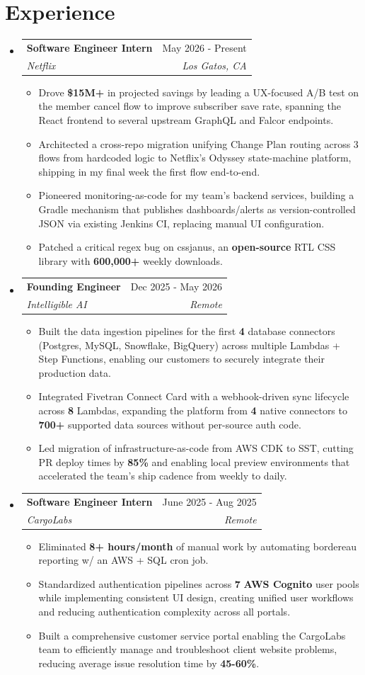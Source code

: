 \documentclass[letterpaper,11pt]{article}
\makeatletter
\newcommand{\resumeItem}[1]{
  \item\small{
    {#1 \vspace{-2pt}}
  }
}
\newcommand{\resumeSubheading}[4]{
  \vspace{-2pt}\item
    \begin{tabular*}{0.97\textwidth}[t]{l@{\extracolsep{\fill}}r}
      \textbf{#1} & #2 \\
      \textit{\small#3} & \textit{\small #4} \\
    \end{tabular*}\vspace{-7pt}
}
\newcommand{\resumeSubHeadingListStart}{\begin{itemize}[leftmargin=0.15in, label={}]}
\newcommand{\resumeSubHeadingListEnd}{\end{itemize}}
\newcommand{\resumeItemListStart}{\begin{itemize}}
\newcommand{\resumeItemListEnd}{\end{itemize}\vspace{-5pt}}
\makeatother
\begin{document}
\section{Experience}
    \resumeSubHeadingListStart

        \resumeSubheading
            {Software Engineer Intern }{May 2026 - Present}
            {Netflix}{Los Gatos, CA}
            \resumeItemListStart
                \resumeItem{Drove \textbf{\$15M+} in projected savings by leading a UX-focused A/B test on the member cancel flow to improve subscriber save rate, spanning the React frontend to several upstream GraphQL and Falcor endpoints.}
                \resumeItem{Architected a cross-repo migration unifying Change Plan routing across 3 flows from hardcoded logic to Netflix's Odyssey state-machine platform, shipping in my final week the first flow end-to-end.}
                \resumeItem{Pioneered monitoring-as-code for my team's backend services, building a Gradle mechanism that publishes dashboards/alerts as version-controlled JSON via existing Jenkins CI, replacing manual UI configuration.}
                \resumeItem{Patched a critical regex bug on cssjanus, an \textbf{open-source} RTL CSS library with \textbf{600,000+} weekly downloads.}
            \resumeItemListEnd 

        \resumeSubheading
            {Founding Engineer}{Dec 2025 - May 2026}
            {Intelligible AI}{Remote}
            \resumeItemListStart
            \resumeItem{Built the data ingestion pipelines for the first \textbf{4} database connectors (Postgres, MySQL, Snowflake, BigQuery) across multiple Lambdas + Step Functions, enabling our customers to securely integrate their production data.}
            \resumeItem{Integrated Fivetran Connect Card  with a webhook-driven sync lifecycle across \textbf{8} Lambdas, expanding the platform from \textbf{4} native connectors to \textbf{700+} supported data sources without per-source auth code.}
              \resumeItem{Led migration of infrastructure-as-code from AWS CDK to SST, cutting PR deploy times by \textbf{85\%} and enabling local preview environments that accelerated the team's ship cadence from weekly to daily.}
            \resumeItemListEnd 
        \resumeSubheading
            {Software Engineer Intern}{June 2025 - Aug 2025}
            {CargoLabs}{Remote}
\resumeItemListStart
    \resumeItem{Eliminated \textbf{8+ hours/month} of manual work by automating bordereau reporting w/ an  AWS + SQL cron job.}
    \resumeItem{Standardized authentication pipelines across \textbf{7} \textbf{AWS Cognito} user pools while implementing consistent UI design, creating unified user workflows and reducing authentication complexity across all portals.} 
    \resumeItem{Built a comprehensive customer service portal enabling the CargoLabs team to efficiently manage and troubleshoot client website problems, reducing average issue resolution time by \textbf{45-60\%}.}
            \resumeItemListEnd 
    \resumeSubHeadingListEnd
\end{document}
